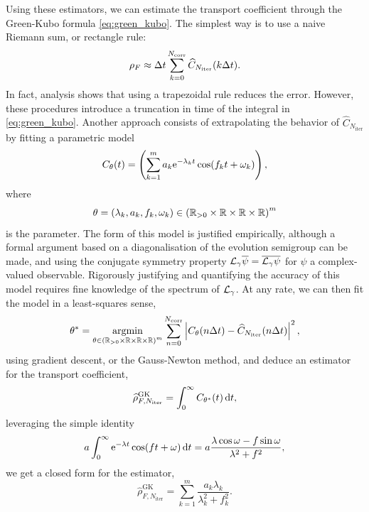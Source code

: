 Using these estimators, we can estimate the transport coefficient through the Green-Kubo formula \eqref{eq:green_kubo}. The simplest way is to use a naive Riemann sum, or rectangle rule:
\[\rho_F \approx {\Delta t}\sum_{k=0}^{N_{\mathrm{corr}}} \widehat{C}_{N_{\mathrm{iter}}}(k{\Delta t}).\]
In fact, analysis shows that using a trapezoidal rule reduces the error.
However, these procedures introduce a truncation in time of the integral in \eqref{eq:green_kubo}.
Another approach consists of extrapolating the behavior of $\widehat{C}_{N_{\mathrm{iter}}}$ by fitting a parametric model 
\begin{equation}
    \label{eq:time_correlation_parametric_model}
    C_{\theta}(t)=\left(\sum_{k=1}^{m}a_k\mathrm{e}^{-\lambda_k t}\cos(f_k t+\omega_k)\right),
\end{equation}
where \[\theta=(\lambda_k,a_k,f_k,\omega_k)\in \left(\mathbb{R}_{>0}\times\mathbb{R}\times \mathbb{R} \times \mathbb{R}\right)^{m}\]
is the parameter. The form of this model is justified empirically, although a formal argument based on a diagonalisation of the evolution semigroup can be made, and using the conjugate symmetry property
$\mathcal{L}_\gamma \overline{\psi}=\overline{\mathcal{L}_\gamma \psi}$
for $\psi$ a complex-valued observable.
Rigorously justifying and quantifying the accuracy of this model requires fine knowledge of the spectrum of $\mathcal{L}_\gamma$.
At any rate, we can then fit the model in a least-squares sense,
\begin{equation}
    \theta^*=\underset{\theta\in \left(\mathbb{R}_{>0}\times\mathbb{R}\times \mathbb{R} \times \mathbb{R}\right)^{m}}{\mathrm{argmin}}\sum_{n=0}^{N_{\mathrm{corr}}}\left| C_{\theta}(n{\Delta t})-\widehat{C}_{N_{\mathrm{iter}}}(n{\Delta t}) \right|^2,
\end{equation}
using gradient descent, or the Gauss-Newton method, and deduce an estimator for the transport coefficient,
\begin{equation}
    \label{eq:rho_F_estimator_GK_fit}
    \widehat{\rho}^{\mathrm{GK}}_{F,N_{\mathrm{iter}}}=\int_0^\infty C_{\theta^*}(t)\,\mathrm{d} t,
\end{equation}
leveraging the simple identity
\begin{equation}
    \label{eq:int_analytic_form}
    a\int_0^{\infty}\mathrm{e}^{-\lambda t}\cos(ft+\omega)\,\mathrm{d} t=a\frac{\lambda\cos \omega - f\sin\omega}{\lambda^2+f^2},
\end{equation}
we get a closed form for the estimator,
\[\widehat{\rho}^{\mathrm{GK}}_{F,N_{\mathrm{iter}}}=\sum_{k=1}^m\frac{a_k\lambda_k}{\lambda_k^2+f_k^2}.\]
